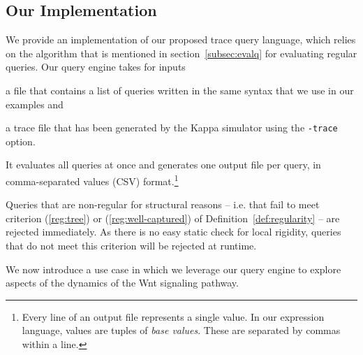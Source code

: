 \documentclass[runningheads]{llncs}
\begin{document}
\subsection{Our Implementation}

We provide an implementation of our proposed trace query language,
which relies on the algorithm that is mentioned in
section~\ref{subsec:evalq} for evaluating regular queries. Our query
engine takes for inputs
\begin{inparaenum}[(i)]
\item a file that contains a list of queries written in the same
  syntax that we use in our examples and
\item a trace file that has been generated by the Kappa simulator
  using the \texttt{-trace} option.
\end{inparaenum}
It evaluates all queries at once and generates one output file per
query, in comma-separated values (CSV) format.\footnote{Every line of
  an output file represents a single value. In our expression
  language, values are tuples of \emph{base values}. These are
  separated by commas within a line.}

Queries that are non-regular for structural reasons -- i.e. that fail
to meet criterion (\ref{reg:tree}) or (\ref{reg:well-captured}) of
Definition~\ref{def:regularity} -- are rejected immediately.  As there
is no easy static check for local rigidity,
queries that do not meet this criterion will be rejected at runtime.

\medskip

We now introduce a use case in which we leverage our query engine to
explore aspects of the dynamics of the Wnt signaling pathway.


\iffalse
However, the first users of our query engine never expressed any
frustration with it, as they naturally came up with regular queries
only.\footnote{Furthermore, they would also write the clauses of their
  patterns in an order that reflects their dependency trees.}  In our
opinion, this is due to the difficulty of interpreting non-regular
queries operationally.
\fi




\newpage 



\end{document}
